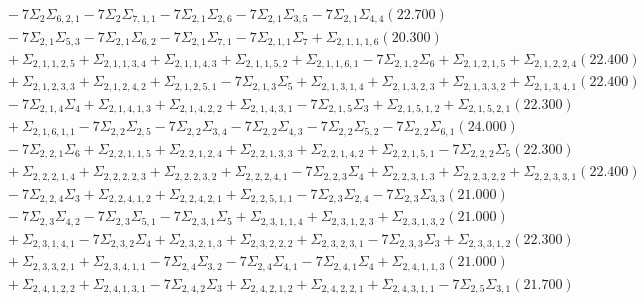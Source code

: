 \documentclass[12pt]{article}
\begin{document}
\begin{landscape}
\begin{align*}
		&\quad\quad -7\Sigma_{2}\Sigma_{6,2,1}-7\Sigma_{2}\Sigma_{7,1,1}-7\Sigma_{2,1}\Sigma_{2,6}-7\Sigma_{2,1}\Sigma_{3,5}-7\Sigma_{2,1}\Sigma_{4,4}(22.700) \\ 
		&\quad\quad -7\Sigma_{2,1}\Sigma_{5,3}-7\Sigma_{2,1}\Sigma_{6,2}-7\Sigma_{2,1}\Sigma_{7,1}-7\Sigma_{2,1,1}\Sigma_{7}+\Sigma_{2,1,1,1,6}(20.300) \\ 
		&\quad\quad +\Sigma_{2,1,1,2,5}+\Sigma_{2,1,1,3,4}+\Sigma_{2,1,1,4,3}+\Sigma_{2,1,1,5,2}+\Sigma_{2,1,1,6,1}-7\Sigma_{2,1,2}\Sigma_{6}+\Sigma_{2,1,2,1,5}+\Sigma_{2,1,2,2,4}(22.400) \\ 
		&\quad\quad +\Sigma_{2,1,2,3,3}+\Sigma_{2,1,2,4,2}+\Sigma_{2,1,2,5,1}-7\Sigma_{2,1,3}\Sigma_{5}+\Sigma_{2,1,3,1,4}+\Sigma_{2,1,3,2,3}+\Sigma_{2,1,3,3,2}+\Sigma_{2,1,3,4,1}(22.400) \\ 
		&\quad\quad -7\Sigma_{2,1,4}\Sigma_{4}+\Sigma_{2,1,4,1,3}+\Sigma_{2,1,4,2,2}+\Sigma_{2,1,4,3,1}-7\Sigma_{2,1,5}\Sigma_{3}+\Sigma_{2,1,5,1,2}+\Sigma_{2,1,5,2,1}(22.300) \\ 
		&\quad\quad +\Sigma_{2,1,6,1,1}-7\Sigma_{2,2}\Sigma_{2,5}-7\Sigma_{2,2}\Sigma_{3,4}-7\Sigma_{2,2}\Sigma_{4,3}-7\Sigma_{2,2}\Sigma_{5,2}-7\Sigma_{2,2}\Sigma_{6,1}(24.000) \\ 
		&\quad\quad -7\Sigma_{2,2,1}\Sigma_{6}+\Sigma_{2,2,1,1,5}+\Sigma_{2,2,1,2,4}+\Sigma_{2,2,1,3,3}+\Sigma_{2,2,1,4,2}+\Sigma_{2,2,1,5,1}-7\Sigma_{2,2,2}\Sigma_{5}(22.300) \\ 
		&\quad\quad +\Sigma_{2,2,2,1,4}+\Sigma_{2,2,2,2,3}+\Sigma_{2,2,2,3,2}+\Sigma_{2,2,2,4,1}-7\Sigma_{2,2,3}\Sigma_{4}+\Sigma_{2,2,3,1,3}+\Sigma_{2,2,3,2,2}+\Sigma_{2,2,3,3,1}(22.400) \\ 
		&\quad\quad -7\Sigma_{2,2,4}\Sigma_{3}+\Sigma_{2,2,4,1,2}+\Sigma_{2,2,4,2,1}+\Sigma_{2,2,5,1,1}-7\Sigma_{2,3}\Sigma_{2,4}-7\Sigma_{2,3}\Sigma_{3,3}(21.000) \\ 
		&\quad\quad -7\Sigma_{2,3}\Sigma_{4,2}-7\Sigma_{2,3}\Sigma_{5,1}-7\Sigma_{2,3,1}\Sigma_{5}+\Sigma_{2,3,1,1,4}+\Sigma_{2,3,1,2,3}+\Sigma_{2,3,1,3,2}(21.000) \\ 
		&\quad\quad +\Sigma_{2,3,1,4,1}-7\Sigma_{2,3,2}\Sigma_{4}+\Sigma_{2,3,2,1,3}+\Sigma_{2,3,2,2,2}+\Sigma_{2,3,2,3,1}-7\Sigma_{2,3,3}\Sigma_{3}+\Sigma_{2,3,3,1,2}(22.300) \\ 
		&\quad\quad +\Sigma_{2,3,3,2,1}+\Sigma_{2,3,4,1,1}-7\Sigma_{2,4}\Sigma_{3,2}-7\Sigma_{2,4}\Sigma_{4,1}-7\Sigma_{2,4,1}\Sigma_{4}+\Sigma_{2,4,1,1,3}(21.000) \\ 
		&\quad\quad +\Sigma_{2,4,1,2,2}+\Sigma_{2,4,1,3,1}-7\Sigma_{2,4,2}\Sigma_{3}+\Sigma_{2,4,2,1,2}+\Sigma_{2,4,2,2,1}+\Sigma_{2,4,3,1,1}-7\Sigma_{2,5}\Sigma_{3,1}(21.700) \\ 

\end{align*}
\end{landscape}
\end{document}
